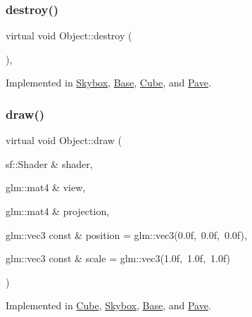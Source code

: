 \subsubsection{\texorpdfstring{destroy()}{destroy()}}
{\footnotesize\ttfamily virtual void Object\+::destroy (\begin{DoxyParamCaption}{ }\end{DoxyParamCaption})\hspace{0.3cm}{\ttfamily [protected]}, {}}



Implemented in \hyperlink{classSkybox_a8a93bcf913a1aae88a9a4aa3d20abacc}{Skybox}, \hyperlink{classBase_ac547253cd64e7bc7e4a675eaa4e880b7}{Base}, \hyperlink{classCube_af4873f0863ce7ad4f37e4af154782a27}{Cube}, and \hyperlink{classPave_a1600213efbebd71a3612bb6812ac463b}{Pave}.

\mbox{\label{classObject_ab1ec4e4c64ac1564d9ccad7655cfaf82}} 
\subsubsection{\texorpdfstring{draw()}{draw()}}
{\footnotesize\ttfamily virtual void Object\+::draw (\begin{DoxyParamCaption}\item[{sf\+::\+Shader \&}]{shader,  }\item[{glm\+::mat4 \&}]{view,  }\item[{glm\+::mat4 \&}]{projection,  }\item[{glm\+::vec3 const \&}]{position = {\ttfamily glm\+:\+:vec3(0.0f,~0.0f,~0.0f)},  }\item[{glm\+::vec3 const \&}]{scale = {\ttfamily glm\+:\+:vec3(1.0f,~1.0f,~1.0f)} }\end{DoxyParamCaption})\hspace{0.3cm}{\ttfamily [pure virtual]}}



Implemented in \hyperlink{classCube_a0dfc84b5634e8c3f0fefd3482085e855}{Cube}, \hyperlink{classSkybox_a6263a420c7ec39e284342988679d3807}{Skybox}, \hyperlink{classBase_ab83ee79d4522f8ad1548d5dd734a3dd5}{Base}, and \hyperlink{classPave_a4dc3714e64f470c05726b7c7200d21e0}{Pave}.

\mbox{\label{classObject_a12b8309292a39b028d5a7b1dfca98cb1}} 
